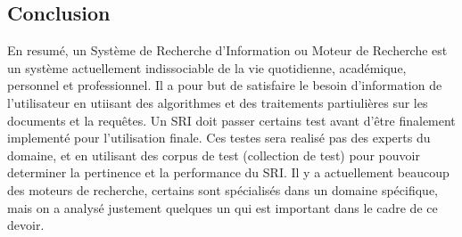 \subsection{Conclusion}
En resumé, un Système de Recherche d'Information ou Moteur de Recherche est un système actuellement indissociable de la vie quotidienne, académique, personnel et professionnel. Il a pour but de satisfaire le besoin d'information de l'utilisateur en utiisant des algorithmes et des traitements partiulières sur les documents et la requêtes. Un SRI doit passer certains test avant d'être finalement implementé pour l'utilisation finale. Ces testes sera realisé pas des experts du domaine, et en utilisant des corpus de test (collection de test) pour pouvoir determiner la pertinence et la performance du SRI. Il y a actuellement beaucoup des moteurs de recherche, certains sont spécialisés dans un domaine spécifique, mais on a analysé justement quelques un qui est important dans le cadre de ce devoir.
